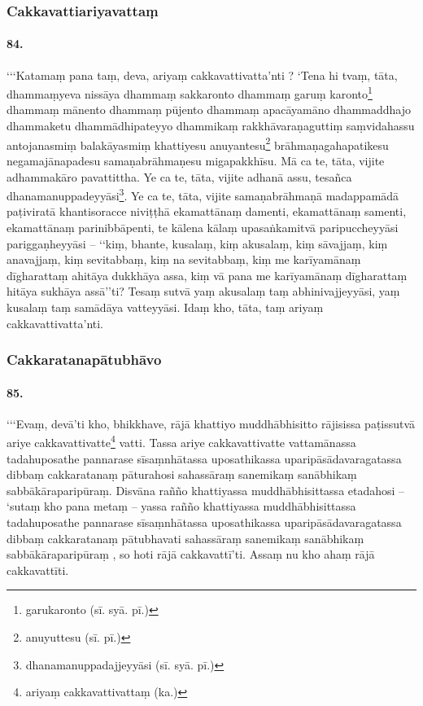 \subsubsection{Cakkavattiariyavattaṃ}

\paragraph{84.} ‘‘‘Katamaṃ pana taṃ, deva, ariyaṃ cakkavattivatta’nti ? ‘Tena hi tvaṃ, tāta, dhammaṃyeva nissāya dhammaṃ sakkaronto dhammaṃ garuṃ karonto\footnote{garukaronto (sī. syā. pī.)} dhammaṃ mānento dhammaṃ pūjento dhammaṃ apacāyamāno dhammaddhajo dhammaketu dhammādhipateyyo dhammikaṃ rakkhāvaraṇaguttiṃ saṃvidahassu antojanasmiṃ balakāyasmiṃ khattiyesu anuyantesu\footnote{anuyuttesu (sī. pī.)} brāhmaṇagahapatikesu negamajānapadesu samaṇabrāhmaṇesu migapakkhīsu. Mā ca te, tāta, vijite adhammakāro pavattittha. Ye ca te, tāta, vijite adhanā assu, tesañca dhanamanuppadeyyāsi\footnote{dhanamanuppadajjeyyāsi (sī. syā. pī.)}. Ye ca te, tāta, vijite samaṇabrāhmaṇā madappamādā paṭiviratā khantisoracce niviṭṭhā ekamattānaṃ damenti, ekamattānaṃ samenti, ekamattānaṃ parinibbāpenti, te kālena kālaṃ upasaṅkamitvā paripuccheyyāsi pariggaṇheyyāsi – ‘‘kiṃ, bhante, kusalaṃ, kiṃ akusalaṃ, kiṃ sāvajjaṃ, kiṃ anavajjaṃ, kiṃ sevitabbaṃ, kiṃ na sevitabbaṃ, kiṃ me karīyamānaṃ dīgharattaṃ ahitāya dukkhāya assa, kiṃ vā pana me karīyamānaṃ dīgharattaṃ hitāya sukhāya assā’’ti? Tesaṃ sutvā yaṃ akusalaṃ taṃ abhinivajjeyyāsi, yaṃ kusalaṃ taṃ samādāya vatteyyāsi. Idaṃ kho, tāta, taṃ ariyaṃ cakkavattivatta’nti.

\subsubsection{Cakkaratanapātubhāvo}

\paragraph{85.} ‘‘‘Evaṃ, devā’ti kho, bhikkhave, rājā khattiyo muddhābhisitto rājisissa paṭissutvā ariye cakkavattivatte\footnote{ariyaṃ cakkavattivattaṃ (ka.)} vatti. Tassa ariye cakkavattivatte vattamānassa tadahuposathe pannarase sīsaṃnhātassa uposathikassa uparipāsādavaragatassa dibbaṃ cakkaratanaṃ pāturahosi sahassāraṃ sanemikaṃ sanābhikaṃ sabbākāraparipūraṃ. Disvāna rañño khattiyassa muddhābhisittassa etadahosi – ‘sutaṃ kho pana metaṃ – yassa rañño khattiyassa muddhābhisittassa tadahuposathe pannarase sīsaṃnhātassa uposathikassa uparipāsādavaragatassa dibbaṃ cakkaratanaṃ pātubhavati sahassāraṃ sanemikaṃ sanābhikaṃ sabbākāraparipūraṃ , so hoti rājā cakkavattī’ti. Assaṃ nu kho ahaṃ rājā cakkavattīti.

